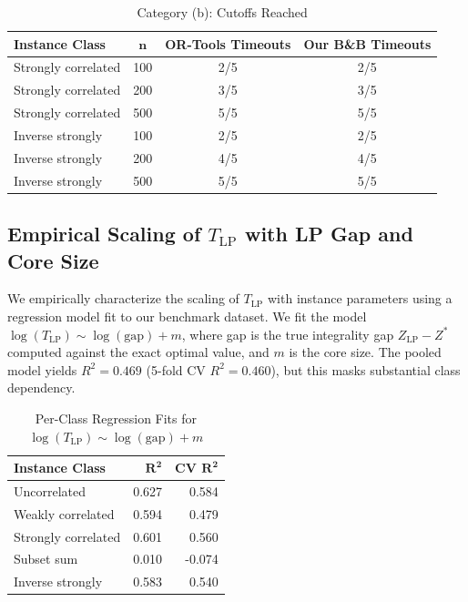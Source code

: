 \documentclass[conference]{IEEEtran} \IEEEoverridecommandlockouts
\begin{document}
\begin{table}[htbp]
\caption{Category (b): Cutoffs Reached}
\label{tab:ortools_cat_b}
\begin{center}
\begin{tabular}{lccc}
\toprule
\textbf{Instance Class} & $\boldsymbol{n}$ & \textbf{OR-Tools Timeouts} & \textbf{Our B\&B Timeouts} \\
\midrule
Strongly correlated & 100 & 2/5 & 2/5 \\
Strongly correlated & 200 & 3/5 & 3/5 \\
Strongly correlated & 500 & 5/5 & 5/5 \\
Inverse strongly & 100 & 2/5 & 2/5 \\
Inverse strongly & 200 & 4/5 & 4/5 \\
Inverse strongly & 500 & 5/5 & 5/5 \\
\bottomrule
\end{tabular}
\end{center}
\end{table}


\subsection{Empirical Scaling of $T_{\text{LP}}$ with LP Gap and Core Size}

We empirically characterize the scaling of $T_{\text{LP}}$ with instance parameters using a regression model fit to our benchmark dataset. We fit the model $\log(T_{\text{LP}}) \sim \log(\text{gap}) + m$, where gap is the true integrality gap $Z_{\text{LP}} - Z^*$ computed against the exact optimal value, and $m$ is the core size. The pooled model yields $R^2 = 0.469$ (5-fold CV $R^2 = 0.460$), but this masks substantial class dependency.

\begin{table}[htbp]
\caption{Per-Class Regression Fits for $\log(T_{\text{LP}}) \sim \log(\text{gap}) + m$}
\label{tab:tlp_regression}
\begin{center}
\begin{tabular}{lrr}
\toprule
\textbf{Instance Class} & $\boldsymbol{R^2}$ & \textbf{CV $\boldsymbol{R^2}$} \\
\midrule
Uncorrelated & 0.627 & 0.584 \\
Weakly correlated & 0.594 & 0.479 \\
Strongly correlated & 0.601 & 0.560 \\
Subset sum & 0.010 & -0.074 \\
Inverse strongly & 0.583 & 0.540 \\
\bottomrule
\end{tabular}
\end{center}
\end{table}
\end{document}
